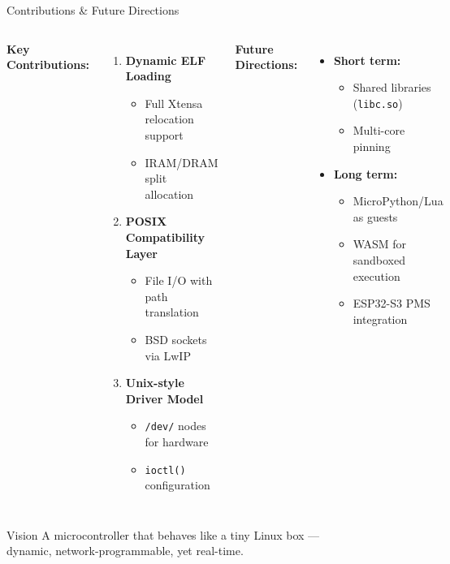 \documentclass[aspectratio=169, 10pt]{beamer}
\begin{document}
\begin{frame}{Contributions \& Future Directions}
    \begin{columns}[T]
        \textbf{Key Contributions:}
        \begin{enumerate}
            \item \textbf{Dynamic ELF Loading}
                \begin{itemize}
                    \item Full Xtensa relocation support
                    \item IRAM/DRAM split allocation
                \end{itemize}
            \item \textbf{POSIX Compatibility Layer}
                \begin{itemize}
                    \item File I/O with path translation
                    \item BSD sockets via LwIP
                \end{itemize}
            \item \textbf{Unix-style Driver Model}
                \begin{itemize}
                    \item \texttt{/dev/} nodes for hardware
                    \item \texttt{ioctl()} configuration
                \end{itemize}
        \end{enumerate}

        \textbf{Future Directions:}
        \begin{itemize}
            \item \textbf{Short term:}
                \begin{itemize}
                    \item Shared libraries (\texttt{libc.so})
                    \item Multi-core pinning
                \end{itemize}
            \item \textbf{Long term:}
                \begin{itemize}
                    \item MicroPython/Lua as guests
                    \item WASM for sandboxed execution
                    \item ESP32-S3 PMS integration
                \end{itemize}
        \end{itemize}
    \end{columns}

    \vspace{0.2cm}
    \begin{exampleblock}{Vision}
        \centering
        A microcontroller that behaves like a tiny Linux box ---\\
        dynamic, network-programmable, yet real-time.
    \end{exampleblock}
\end{frame}
\end{document}
